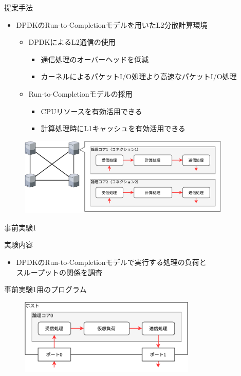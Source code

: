 \documentclass[12pt, unicode]{beamer}
\begin{document}
\begin{frame}{提案手法}
  \begin{itemize}
    \item DPDKのRun-to-Completionモデルを用いたL2分散計算環境
    \begin{itemize}
      \item DPDKによるL2通信の使用
      \begin{itemize}
        \item 通信処理のオーバーヘッドを低減
        \item カーネルによるパケットI/O処理より高速なパケットI/O処理
      \end{itemize}
      \item Run-to-Completionモデルの採用
      \begin{itemize}
        \item CPUリソースを有効活用できる
        \item 計算処理時にL1キャッシュを有効活用できる
      \end{itemize}
    \end{itemize}
  \end{itemize}

  \begin{figure}[h]
    \centering
    \includegraphics[width=0.9\textwidth]{pictures/Proposed.pdf}
  \end{figure}
\end{frame}

\begin{frame}[fragile]{事前実験1}
  \begin{block}{実験内容}
    \begin{itemize}
      \item DPDKのRun-to-Completionモデルで実行する処理の負荷と\\スループットの関係を調査
    \end{itemize}
  \end{block}

  \begin{block}{事前実験1用のプログラム}
    \begin{figure}[h]
      \centering
      \includegraphics[width=0.75\textwidth]{pictures/PreExperimentOne.pdf}
    \end{figure}
  \end{block}
\end{frame}
\end{document}
